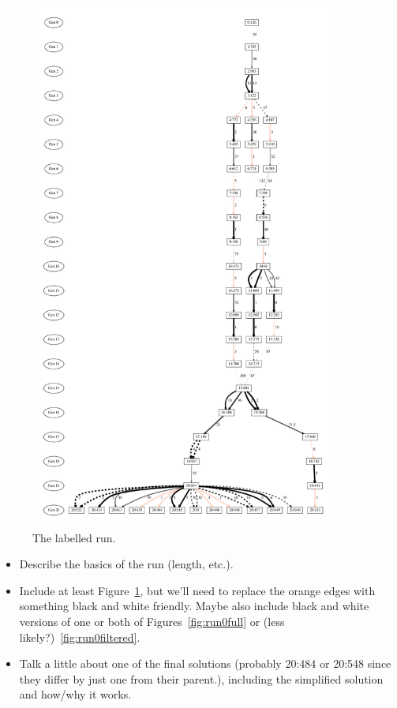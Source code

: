 \begin{figure}[tb!p] %
	\begin{center}
		\includegraphics[width=0.9\textwidth]{../figures/run0_filtered_BandW}
	\end{center}
	\caption{The labelled run.}
	\label{fig:run0Labelled}       %
\end{figure}

\begin{itemize}
	\item Describe the basics of the run (length, etc.).
	\item Include at least Figure~\ref{fig:run0Labelled}, but we'll need to
	replace the orange edges with something black and white friendly. 
	Maybe also include 
	black and white versions of one or both of Figures~\ref{fig:run0full} or 
	(less likely?)~\ref{fig:run0filtered}.
	\item Talk a little about one of the final solutions (probably 20:484 or 20:548 since they differ by just one from their parent.), including the simplified solution and how/why it works.
\end{itemize}

